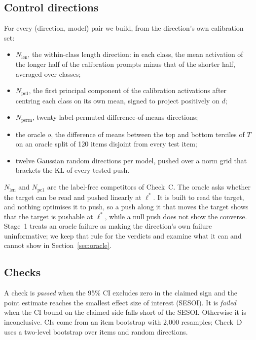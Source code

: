\documentclass[11pt]{article}
\begin{document}
\subsection{Control directions}
For every (direction, model) pair we build, from the direction's own calibration set:
\begin{itemize}
\item $N_\text{len}$, the within-class length direction: in each class, the mean activation of the longer half of the calibration prompts minus that of the shorter half, averaged over classes;
\item $N_\text{pc1}$, the first principal component of the calibration activations after centring each class on its own mean, signed to project positively on $d$;
\item $N_\text{perm}$, twenty label-permuted difference-of-means directions;
\item the oracle $o$, the difference of means between the top and bottom terciles of $T$ on an oracle split of 120 items disjoint from every test item;
\item twelve Gaussian random directions per model, pushed over a norm grid that brackets the KL of every tested push.
\end{itemize}
$N_\text{len}$ and $N_\text{pc1}$ are the label-free competitors of Check~C. The oracle asks whether the target can be read and pushed linearly at $\ell^*$. It is built to read the target, and nothing optimises it to push, so a push along it that moves the target shows that the target is pushable at $\ell^*$, while a null push does not show the converse. Stage~1 treats an oracle failure as making the direction's own failure uninformative; we keep that rule for the verdicts and examine what it can and cannot show in Section~\ref{sec:oracle}.

\subsection{Checks}
A check is \emph{passed} when the 95\% CI excludes zero in the claimed sign and the point estimate reaches the smallest effect size of interest (SESOI). It is \emph{failed} when the CI bound on the claimed side falls short of the SESOI. Otherwise it is inconclusive. CIs come from an item bootstrap with 2,000 resamples; Check~D uses a two-level bootstrap over items and random directions.
\end{document}
